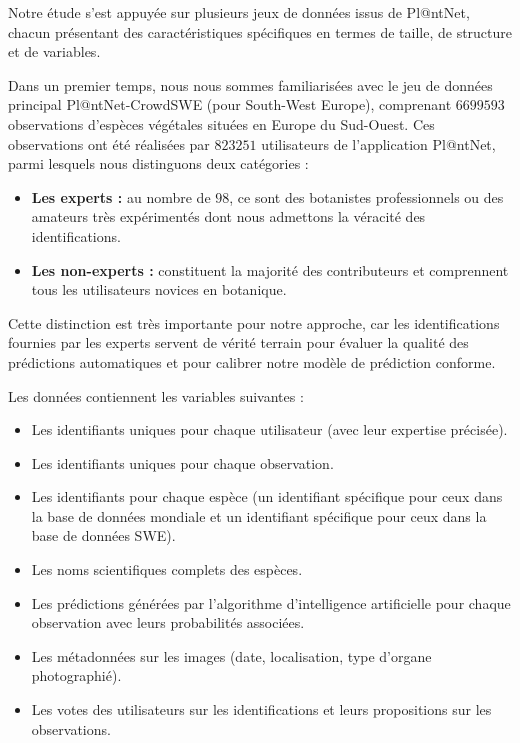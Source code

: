 \documentclass[a4paper,12pt]{article}
\begin{document}
Notre étude s'est appuyée sur plusieurs jeux de données issus de Pl@ntNet, chacun présentant des caractéristiques spécifiques en termes de taille, de structure et de variables.

\vspace{0.2cm}

Dans un premier temps, nous nous sommes familiarisées avec le jeu de données principal Pl@ntNet-CrowdSWE (pour South-West Europe), comprenant $\num{6 699 593}$ observations d'espèces végétales situées en Europe du Sud-Ouest. Ces observations ont été réalisées par $\num{823 251}$ utilisateurs de l'application Pl@ntNet, parmi lesquels nous distinguons deux catégories : 
\begin{itemize}
    \item \textbf{Les experts :} au nombre de $98$, ce sont des botanistes professionnels ou des amateurs très expérimentés dont nous admettons la véracité des identifications.
    \item \textbf{Les non-experts :} constituent la majorité des contributeurs et comprennent tous les utilisateurs novices en botanique.
\end{itemize}

\vspace{0.2cm}

Cette distinction est très importante pour notre approche, car les identifications fournies par les experts servent de vérité terrain pour évaluer la qualité des prédictions automatiques et pour calibrer notre modèle de prédiction conforme.

\vspace{0.2cm}

Les données contiennent les variables suivantes :
\begin{itemize}
    \item Les identifiants uniques pour chaque utilisateur (avec leur expertise précisée).
    \item Les identifiants uniques pour chaque observation.
    \item Les identifiants pour chaque espèce (un identifiant spécifique pour ceux dans la base de données mondiale et un identifiant spécifique pour ceux dans la base de données SWE).
    \item Les noms scientifiques complets des espèces.
    \item Les prédictions générées par l'algorithme d'intelligence artificielle pour chaque observation avec leurs probabilités associées.
    \item Les métadonnées sur les images (date, localisation, type d'organe photographié).
    \item Les votes des utilisateurs sur les identifications et leurs propositions sur les observations.
\end{itemize}
\end{document}
